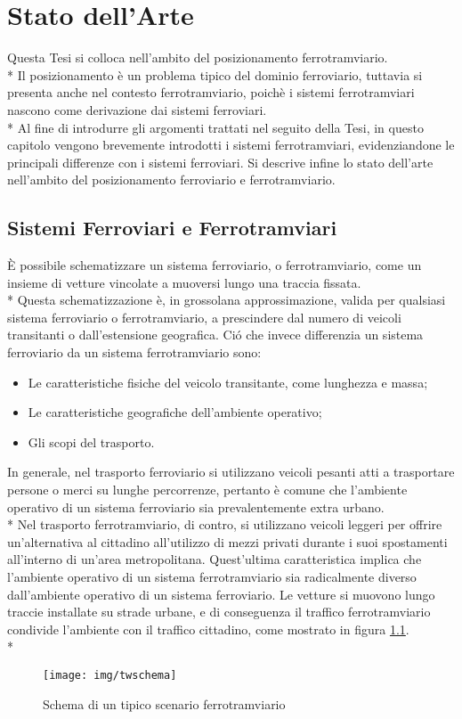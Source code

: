 \chapter{Stato dell'Arte}
Questa Tesi si colloca nell'ambito del posizionamento ferrotramviario.\\*
Il posizionamento \`e un problema tipico del dominio ferroviario, tuttavia si presenta anche nel contesto ferrotramviario, poich\`e i sistemi ferrotramviari nascono come derivazione dai sistemi ferroviari.\\*
Al fine di introdurre gli argomenti trattati nel seguito della Tesi, in questo capitolo vengono brevemente introdotti i sistemi ferrotramviari, evidenziandone le principali differenze con i sistemi ferroviari. Si descrive infine lo stato dell'arte nell'ambito del posizionamento ferroviario e ferrotramviario.
\section{Sistemi Ferroviari e Ferrotramviari}
\`E possibile schematizzare un sistema ferroviario, o ferrotramviario, come un insieme di vetture vincolate a muoversi lungo una traccia fissata.\\*
Questa schematizzazione \`e, in grossolana approssimazione, valida per qualsiasi sistema ferroviario o ferrotramviario, a prescindere dal numero di veicoli transitanti o dall'estensione geografica. Ci\'o che invece differenzia un sistema ferroviario da un sistema ferrotramviario sono:
\begin{itemize}
		\item Le caratteristiche fisiche del veicolo transitante, come lunghezza e massa;
		\item Le caratteristiche geografiche dell'ambiente operativo;
		\item Gli scopi del trasporto.
\end{itemize}
In generale, nel trasporto ferroviario si utilizzano veicoli pesanti atti a trasportare persone o merci su lunghe percorrenze, pertanto \`e comune che l'ambiente operativo di un sistema ferroviario sia prevalentemente extra urbano.\\*
Nel trasporto ferrotramviario, di contro, si utilizzano veicoli leggeri per offrire un'alternativa al cittadino all'utilizzo di mezzi privati durante i suoi spostamenti all'interno di un'area metropolitana. Quest'ultima caratteristica implica che l'ambiente operativo di un sistema ferrotramviario sia radicalmente diverso dall'ambiente operativo di un sistema ferroviario. Le vetture si muovono lungo traccie installate su strade urbane, e di conseguenza il traffico ferrotramviario condivide l'ambiente con il traffico cittadino, come mostrato in figura \ref{fig:tramschema}.\\*
\begin{figure}[h]
		\centering
		\texttt{[image: img/twschema]}
		\caption{Schema di un tipico scenario ferrotramviario}
		\label{fig:tramschema}
\end{figure}
